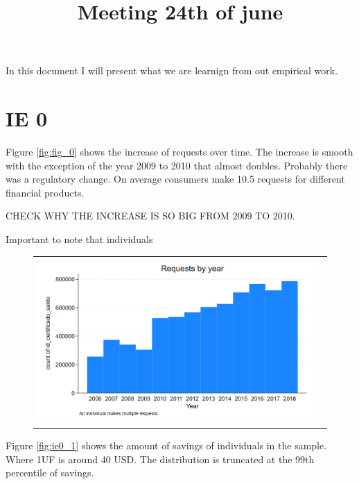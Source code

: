 \documentclass[12pt]{article}
\begin{document}
\title{Meeting 24th of june}

\maketitle

In this document I will present what we are learnign from out empirical work. 

\section{IE 0}

Figure \ref{fig:fig_0} shows the increase of requests over time. The increase is smooth with the exception of the year 2009 to 2010 that almost doubles. Probably there was a regulatory change. 
On average consumers make 10.5 requests for different financial products. 

CHECK WHY THE INCREASE IS SO BIG FROM 2009 TO 2010.

Important to note that individuals 
\begin{figure}[H] \label{fig:ie0_0}
\caption{}
\centering{}%
\begin{tabular}{cc}
\includegraphics[scale=0.27]{figures/IE0_plot0.png}
\end{tabular}
\end{figure}


Figure \ref{fig:ie0_1} shows the amount of savings of individuals in the sample. Where 1UF is around 40 USD. The distribution is truncated at the 99th percentile of savings. 
\end{document}
